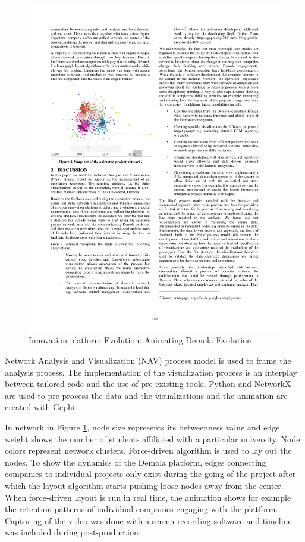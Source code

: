 \begin{figure}[htb]
\centering
\includegraphics[width=12cm]{figure/Animating-Demola-Evolution.pdf}
\caption{Innovation platform Evolution: Animating Demola Evolution \citep{Huhtamaki2013ProcessDemola}}
\label{fig:animating-demola}
\end{figure}

Network Analysis and Visualization (NAV) process model \citep{Hansen2012DoData} is used to frame the analysis process. The implementation of the visualization process is an interplay between tailored code and the use of pre-existing tools. Python and NetworkX are used to pre-process the data and the visualizations and the animation are created with Gephi.

In network in Figure \ref{fig:animating-demola}, node size represents its betweenness value and edge weight shows the number of students affiliated with a particular university. Node colors represent network clusters. Force-driven algorithm is used to lay out the nodes. To show the dynamics of the Demola platform, edges connecting companies to individual projects only exist during the going of the project after which the layout algorithm starts pushing loose nodes away from the center. When force-driven layout is run in real time, the animation shows for example the retention patterns of individual companies engaging with the platform. Capturing of the video was done with a screen-recording software and timeline was included during post-production.

